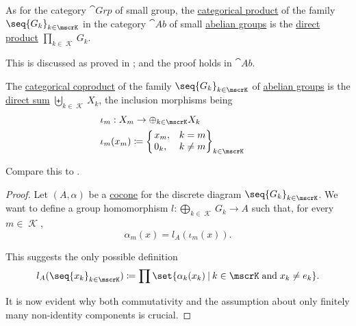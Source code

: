 \begin{proposition}\label{thm:abelian_group_categorical_limits}
  \hfill
  \begin{thmenum}
     As for the category \hyperref[def:group/category]{\( \cat{Grp} \)} of small group, the \hyperref[def:discrete_category_limits]{categorical product} of the family \( \seq{ G_k }_{k \in \mscrK} \) in the category \( \cat{Ab} \) of small \hyperref[def:abelian_group]{abelian groups} is the \hyperref[def:group_direct_product]{direct product} \( \prod_{k \in \mscrK} G_k \).

    This is discussed as proved in ; and the proof holds in \( \cat{Ab} \).

     The \hyperref[def:discrete_category_limits]{categorical coproduct} of the family \( \seq{ G_k }_{k \in \mscrK} \) of \hyperref[def:abelian_group]{abelian groups} is the \hyperref[def:group_direct_sum]{direct sum} \( \biguplus_{k \in \mscrK} X_k \), the inclusion morphisms being
    \begin{equation*}
      \begin{aligned}
         &\iota_m: X_m \to \oplus_{k \in \mscrK} X_k \\
         &\iota_m(x_m) \coloneqq \begin{cases}
          \begin{rcases}
            x_m, &k = m \\
            0_k, &k \neq m
          \end{rcases}_{k \in \mscrK}
        \end{cases}
      \end{aligned}
    \end{equation*}

    Compare this to .
  \end{thmenum}
\end{proposition}
\begin{proof}
   Let \( (A, \alpha) \) be a \hyperref[def:category_of_cones/cocone]{cocone} for the discrete diagram \( \seq{ G_k }_{k \in \mscrK} \). We want to define a group homomorphism \( l: \bigoplus_{k \in \mscrK} G_k \to A \) such that, for every \( m \in \mscrK \),
  \begin{equation*}
    \alpha_m(x) = l_A(\iota_m(x)).
  \end{equation*}

  This suggests the only possible definition
  \begin{equation*}
    l_A(\seq{ x_k }_{k \in \mscrK}) \coloneqq \prod\set{ \alpha_k(x_k) \given k \in \mscrK \T{and} x_k \neq e_k }.
  \end{equation*}

  It is now evident why both commutativity and the assumption about only finitely many non-identity components is crucial.
\end{proof}

